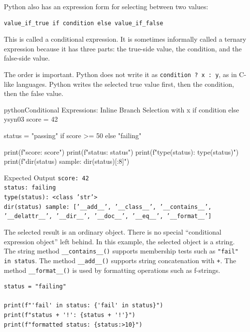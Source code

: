 Python also has an expression form for selecting between two values:

\begin{verbatim}
value_if_true if condition else value_if_false
\end{verbatim}

This is called a conditional expression. It is sometimes informally called a ternary expression because it has three parts: the true-side value, the condition, and the false-side value.

The order is important. Python does not write it as \texttt{condition ? x : y}, as in C-like languages. Python writes the selected true value first, then the condition, then the false value.

\begin{codebox}[]{python}{Conditional Expressions: Inline Branch Selection with x if condition else y}{syn03}
score = 42

status = "passing" if score >= 50 else "failing"

print(f"score: {score}")
print(f"status: {status}")
print(f"type(status): {type(status)}")
print(f"dir(status) sample: {dir(status)[:8]}")
\end{codebox}


\begin{iobox}{Expected Output}
\texttt{score: 42} \\
\texttt{status: failing} \\
\texttt{type(status): <class 'str'>} \\
\texttt{dir(status) sample: ['\_\_add\_\_', '\_\_class\_\_', '\_\_contains\_\_', '\_\_delattr\_\_', '\_\_dir\_\_', '\_\_doc\_\_', '\_\_eq\_\_', '\_\_format\_\_']} \\
\end{iobox}


The selected result is an ordinary object. There is no special ``conditional expression object'' left behind. In this example, the selected object is a string. The string method \texttt{\_\_contains\_\_()} supports membership tests such as \texttt{"fail" in status}. The method \texttt{\_\_add\_\_()} supports string concatenation with \texttt{+}. The method \texttt{\_\_format\_\_()} is used by formatting operations such as f-strings.

\begin{verbatim}
status = "failing"

print(f"'fail' in status: {'fail' in status}")
print(f"status + '!': {status + '!'}")
print(f"formatted status: {status:>10}")
\end{verbatim}

